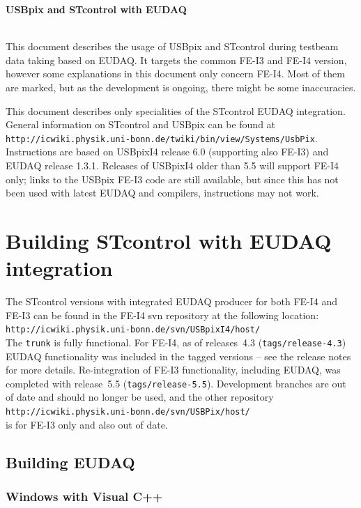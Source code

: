 \documentclass[a4paper,12pt]{article}
\begin{document}
\centerline{\bf\LARGE USBpix and STcontrol with EUDAQ}\ \\[5mm]

This document describes the usage of USBpix and STcontrol during testbeam data taking based
on EUDAQ. It targets the common FE-I3 and FE-I4 version, however some explanations in this document 
only concern FE-I4. Most of them are marked,
but as the development is ongoing, there might be some inaccuracies.

This document describes only specialities of the STcontrol EUDAQ integration. 
General information on STcontrol and USBpix can be found at \\
{\tt http://icwiki.physik.uni-bonn.de/twiki/bin/view/Systems/UsbPix}.\\
Instructions are based on USBpixI4 release 6.0 (supporting also FE-I3) and EUDAQ release 1.3.1. 
Releases of USBpixI4 older than 5.5 will support FE-I4 only; links to 
the USBpix FE-I3 code are still available, but since this has not been used
with latest EUDAQ and compilers, instructions may not work.

\section{Building STcontrol with EUDAQ integration}

The STcontrol versions with integrated EUDAQ producer for both FE-I4 and FE-I3
can be found in the FE-I4 svn repository at the following location:\\
{\tt http://icwiki.physik.uni-bonn.de/svn/USBpixI4/host/}\\
The {\tt trunk} is fully functional. For FE-I4, as of releases~4.3
 ({\tt tags/release-4.3}) EUDAQ functionality was included in the 
tagged versions -- see the release notes for more details. Re-integration
of FE-I3 functionality, including EUDAQ, was completed with release~5.5
({\tt tags/release-5.5}).
Development branches are out of date and should no longer be used, and the
other repository \\{\tt http://icwiki.physik.uni-bonn.de/svn/USBPix/host/}\\
is for FE-I3 only and also out of date.

\subsection{Building EUDAQ}

\subsubsection{Windows with Visual C++}
\end{document}
